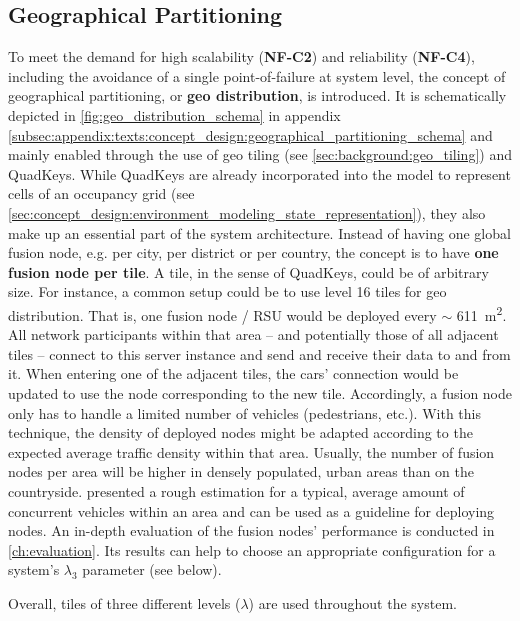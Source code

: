 \subsection{Geographical Partitioning}
\label{subsec:concept_design:geographical_partitioning}
To meet the demand for high scalability (\textbf{NF-C2}) and reliability (\textbf{NF-C4}), including the avoidance of a single point-of-failure at system level, the concept of geographical partitioning, or \textbf{geo distribution}, is introduced. It is schematically depicted in \cref{fig:geo_distribution_schema} in appendix \cref{subsec:appendix:texts:concept_design:geographical_partitioning_schema} and mainly enabled through the use of geo tiling (see \cref{sec:background:geo_tiling}) and QuadKeys. While QuadKeys are already incorporated into the model to represent cells of an occupancy grid (see \cref{sec:concept_design:environment_modeling_state_representation}), they also make up an essential part of the system architecture. Instead of having one global fusion node, e.g. per city, per district or per country, the concept is to have \textbf{one fusion node per tile}. A tile, in the sense of QuadKeys, could be of arbitrary size. For instance, a common setup could be to use level 16 tiles for geo distribution. That is, one fusion node / RSU would be deployed every $\sim$ \SI{611}{\square\meter}. All network participants within that area – and potentially those of all adjacent tiles – connect to this server instance and send and receive their data to and from it. When entering one of the adjacent tiles, the cars' connection would be updated to use the node corresponding to the new tile. Accordingly, a fusion node only has to handle a limited number of vehicles (pedestrians, etc.). With this technique, the density of deployed nodes might be adapted according to the expected average traffic density within that area. Usually, the number of fusion nodes per area will be higher in densely populated, urban areas than on the countryside.  presented a rough estimation for a typical, average amount of concurrent vehicles within an area and can be used as a guideline for deploying nodes. An in-depth evaluation of the fusion nodes' performance is conducted in \cref{ch:evaluation}. Its results can help to choose an appropriate configuration for a system's $\lambda_3$ parameter (see below).
\par
\bigskip

Overall, tiles of three different levels ($\lambda$) are used throughout the system.

